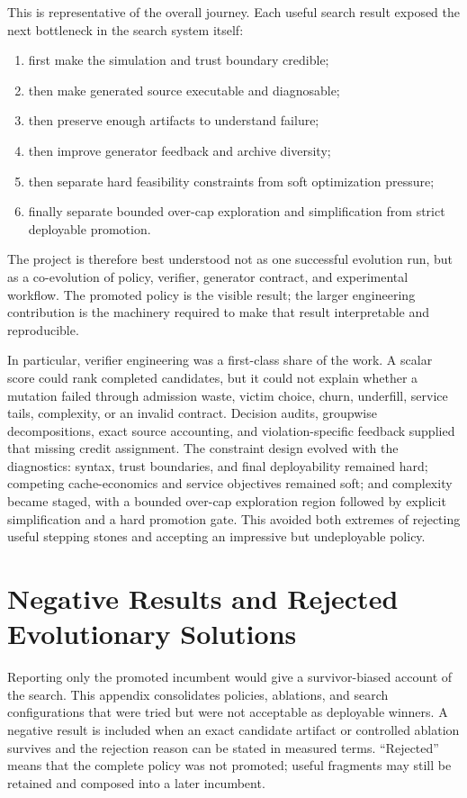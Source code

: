 \documentclass[11pt]{article}
\begin{document}
This is representative of the overall journey.  Each useful search result exposed the
next bottleneck in the search system itself:

\begin{enumerate}
  \item first make the simulation and trust boundary credible;
  \item then make generated source executable and diagnosable;
  \item then preserve enough artifacts to understand failure;
  \item then improve generator feedback and archive diversity;
  \item then separate hard feasibility constraints from soft optimization pressure;
  \item finally separate bounded over-cap exploration and simplification from strict
  deployable promotion.
\end{enumerate}

The project is therefore best understood not as one successful evolution run, but as a
co-evolution of policy, verifier, generator contract, and experimental workflow.  The
promoted policy is the visible result; the larger engineering contribution is the
machinery required to make that result interpretable and reproducible.

In particular, verifier engineering was a first-class share of the work.  A scalar
score could rank completed candidates, but it could not explain whether a mutation
failed through admission waste, victim choice, churn, underfill, service tails,
complexity, or an invalid contract.  Decision audits, groupwise decompositions, exact
source accounting, and violation-specific feedback supplied that missing credit
assignment.  The constraint design evolved with the diagnostics: syntax, trust
boundaries, and final deployability remained hard; competing cache-economics and
service objectives remained soft; and complexity became staged, with a bounded
over-cap exploration region followed by explicit simplification and a hard promotion
gate.  This avoided both extremes of rejecting useful stepping stones and accepting
an impressive but undeployable policy.

\section{Negative Results and Rejected Evolutionary Solutions}
\label{app:negative-results}

Reporting only the promoted incumbent would give a survivor-biased account of the
search.  This appendix consolidates policies, ablations, and search configurations that
were tried but were not acceptable as deployable winners.  A negative result is
included when an exact candidate artifact or controlled ablation survives and the
rejection reason can be stated in measured terms.  ``Rejected'' means that the complete
policy was not promoted; useful fragments may still be retained and composed into a
later incumbent.
\end{document}
